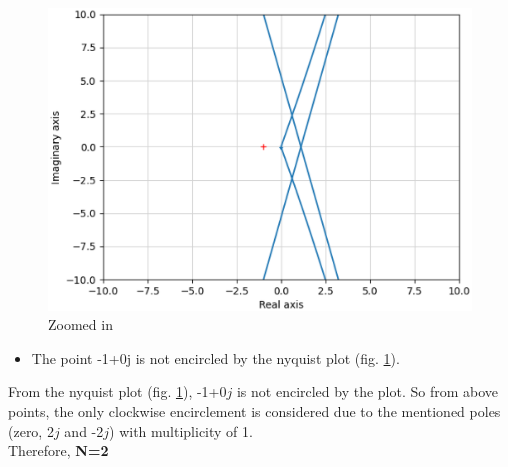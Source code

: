 \begin{enumerate}[label=\thesubsection.\arabic*.,ref=\thesubsection.\theenumi]
\begin{figure}[ht!]
    \includegraphics[width=\columnwidth]{./figs/ee18btech11025/g2.eps}
    \caption{Zoomed in}
    \label{fig:nyqplot1}
\end{figure}
\begin{itemize}
    \item The point -1+0j is not encircled by the nyquist plot (fig. \ref{fig:nyqplot1}).
\end{itemize}
From the nyquist plot (fig. \ref{fig:nyqplot1}), -1+0$j$ is not encircled by the plot. 
So from above points, the only clockwise encirclement is considered due to the mentioned poles (zero, 2$j$ and -2$j$)  with multiplicity of 1. \\  
Therefore, \textbf{N=2}


\end{enumerate}
